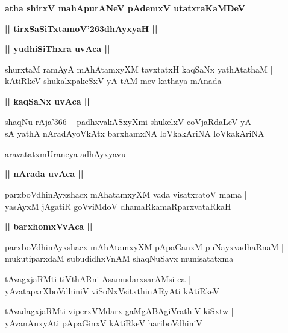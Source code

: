 \documentclass[twoside,12pt,openright]{book}
\def\S{\char'263}
\newcounter{shloka}[chapter]
\def\uvaca#1{\centerline{{\large\textbf{#1}}}}
\begin{document}
\begin{center}
{\LARGE\bfseries atha shirxV mahApurANeV pAdemxV utatxraKaMDeV}
\end{center}

\begin{center}
{\LARGE\bfseries || tirxSaSiTxtamoV\S dhAyxyaH ||}
\end{center}

\uvaca{|| yudhiSiThxra uvAca ||}

\begin{shloka}%
shurxtaM ramAyA mAhAtamxyXM tavxtatxH kaqSaNx yathAtathaM |\\
kAtiRkeV shukalxpakeSxV yA tAM mev kathaya mAnada
\end{shloka}

\uvaca{|| kaqSaNx uvAca ||}

\begin{shloka}%
shaqNu rAja\char'366 ~ padhxvakASxyXmi shukelxV coVjaRdaLeV yA |\\
sA yathA nAradAyoVkAtx barxhamxNA loVkakAriNA loVkakAriNA
\end{shloka}

\begin{center}
aravatatxmUraneya adhAyxyavu
\end{center}

\uvaca{|| nArada uvAca ||}

\begin{shloka}%
parxboVdhinAyxshacx mAhatamxyXM vada visatxratoV mama |\\
yasAyxM jAgatiR goVviMdoV dhamaRkamaRparxvataRkaH 
\end{shloka}

\uvaca{|| barxhomxVvAca ||}

\begin{shloka}%
parxboVdhinAyxshacx mAhAtamxyXM pApaGanxM puNayxvadhaRnaM |\\
mukutiparxdaM subudidhxVnAM shaqNuSavx munisatatxma
\end{shloka}

\begin{shloka}%
tAvagxjaRMti tiVthARni AsamudarxsarAMsi ca |\\
yAvatapxrXboVdhiniV viSoNxVsitxthinARyAti kAtiRkeV 
\end{shloka}

\begin{shloka}%
tAvadagxjaRMti viperxVMdarx gaMgABAgiVrathiV kiSxtw |\\
yAvanAnxyAti pApaGinxV kAtiRkeV hariboVdhiniV
\end{shloka}
\end{document}
